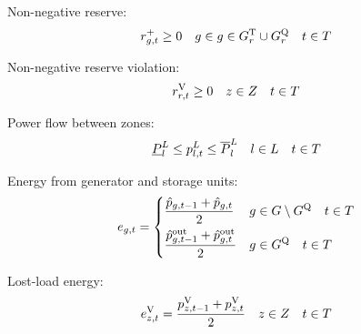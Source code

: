 \documentclass{article}
\begin{document}
Non-negative reserve:
\begin{equation}
\vReserveUp \geq 0 \quad  \iGenerator \in \iGenerator \in \sGeneratorsThermal_{\iRegion} \cup \sStorage_{\iRegion} \quad \iInterval \in \sIntervals
\end{equation}

Non-negative reserve violation:
\begin{equation}
\vReserveUpViolation \geq 0 \quad  \iZone \in \sZones  \quad \iInterval \in \sIntervals
\end{equation}

Power flow between zones:
\begin{equation}
\cPowerFlowMin \leq \vPowerFlow \leq \cPowerFlowMax \quad  \iLink \in \sLinks  \quad  \iInterval \in \sIntervals
\label{eqn: powerflow constraints}
\end{equation}

Energy from generator and storage units:
\begin{equation}
\vEnergy = \begin{dcases}
\frac{\vPowerTotal[\iGenerator, \iInterval-1] + \vPowerTotal}{2} &  \iGenerator \in \sGenerators \setminus \sStorage  \quad  \iInterval \in \sIntervals\\
\frac{\vPowerTotalOut[\iGenerator, \iInterval-1] + \vPowerTotalOut}{2} &  \iGenerator \in \sStorage  \quad  \iInterval \in \sIntervals\\
\end{dcases}
\end{equation}

Lost-load energy:
\begin{equation}
\vLostLoadEnergy = \frac{\vLostLoadPower[\iZone, \iInterval-1] + \vLostLoadPower}{2} \quad  \iZone \in \sZones  \quad  \iInterval \in \sIntervals
\label{eqn: lost-load energy constraint}
\end{equation}
\end{document}
